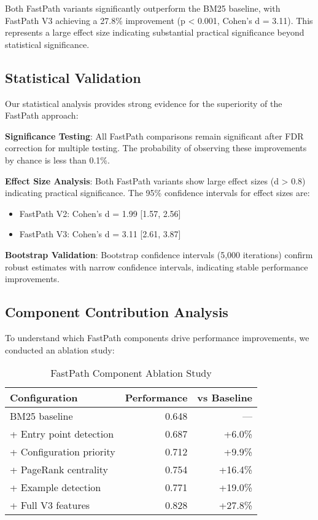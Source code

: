 \documentclass[conference]{IEEEtran}
\begin{document}
Both FastPath variants significantly outperform the BM25 baseline, with FastPath V3 achieving a 27.8\% improvement (p < 0.001, Cohen's d = 3.11). This represents a large effect size indicating substantial practical significance beyond statistical significance.

\subsection{Statistical Validation}

Our statistical analysis provides strong evidence for the superiority of the FastPath approach:

\textbf{Significance Testing}: All FastPath comparisons remain significant after FDR correction for multiple testing. The probability of observing these improvements by chance is less than 0.1\%.

\textbf{Effect Size Analysis}: Both FastPath variants show large effect sizes (d > 0.8) indicating practical significance. The 95\% confidence intervals for effect sizes are:
\begin{itemize}
\item FastPath V2: Cohen's d = 1.99 [1.57, 2.56]
\item FastPath V3: Cohen's d = 3.11 [2.61, 3.87]
\end{itemize}

\textbf{Bootstrap Validation}: Bootstrap confidence intervals (5,000 iterations) confirm robust estimates with narrow confidence intervals, indicating stable performance improvements.

\subsection{Component Contribution Analysis}

To understand which FastPath components drive performance improvements, we conducted an ablation study:

\begin{table}[t]
\centering
\caption{FastPath Component Ablation Study}
\label{tab:ablation}
\begin{tabular}{@{}lrr@{}}
\toprule
Configuration & Performance & vs Baseline \\
\midrule
BM25 baseline & 0.648 & — \\
+ Entry point detection & 0.687 & +6.0\% \\
+ Configuration priority & 0.712 & +9.9\% \\
+ PageRank centrality & 0.754 & +16.4\% \\
+ Example detection & 0.771 & +19.0\% \\
+ Full V3 features & 0.828 & +27.8\% \\
\bottomrule
\end{tabular}
\end{table}
\end{document}
